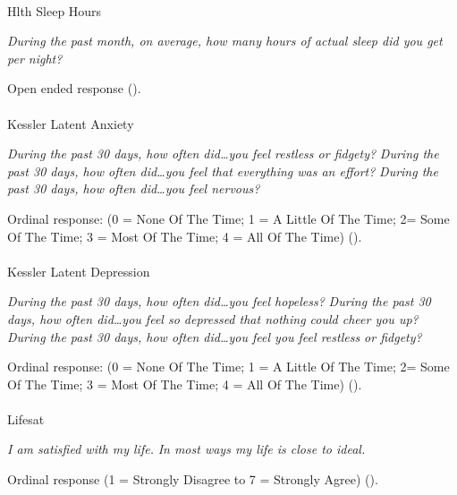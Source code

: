 \documentclass[
  single column]{article}
\makeatletter
\let\oldparagraph\paragraph
\renewcommand{\paragraph}{
    \@ifstar
      \xxxParagraphStar
      \xxxParagraphNoStar
  }
\newcommand{\xxxParagraphStar}[1]{\oldparagraph*{#1}\mbox{}}
\newcommand{\xxxParagraphNoStar}[1]{\oldparagraph{#1}\mbox{}}
\makeatother
\begin{document}
\paragraph{Hlth Sleep Hours}\label{hlth-sleep-hours}

\emph{During the past month, on average, how many hours of actual sleep
did you get per night?}

Open ended response ().

\paragraph{Kessler Latent Anxiety}\label{kessler-latent-anxiety}

\emph{During the past 30 days, how often did\ldots you feel restless or
fidgety?} \emph{During the past 30 days, how often did\ldots you feel
that everything was an effort?} \emph{During the past 30 days, how often
did\ldots you feel nervous?}

Ordinal response: (0 = None Of The Time; 1 = A Little Of The Time; 2=
Some Of The Time; 3 = Most Of The Time; 4 = All Of The Time)
().

\paragraph{Kessler Latent Depression}\label{kessler-latent-depression}

\emph{During the past 30 days, how often did\ldots you feel hopeless?}
\emph{During the past 30 days, how often did\ldots you feel so depressed
that nothing could cheer you up?} \emph{During the past 30 days, how
often did\ldots you feel you feel restless or fidgety?}

Ordinal response: (0 = None Of The Time; 1 = A Little Of The Time; 2=
Some Of The Time; 3 = Most Of The Time; 4 = All Of The Time)
().

\paragraph{Lifesat}\label{lifesat}

\emph{I am satisfied with my life.} \emph{In most ways my life is close
to ideal.}

Ordinal response (1 = Strongly Disagree to 7 = Strongly Agree)
().
\end{document}

